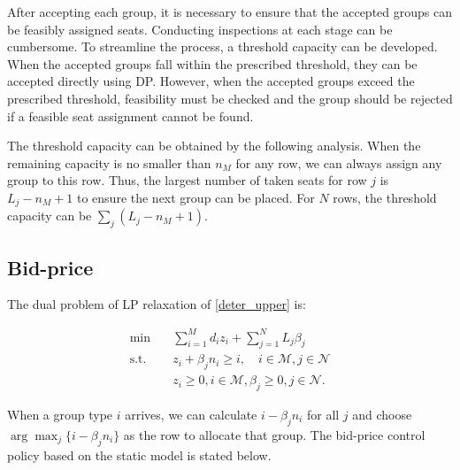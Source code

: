 



After accepting each group, it is necessary to ensure that the accepted groups can be feasibly assigned seats. Conducting inspections at each stage can be cumbersome. To streamline the process, a threshold capacity can be developed. When the accepted groups fall within the prescribed threshold, they can be accepted directly using DP. However, when the accepted groups exceed the prescribed threshold, feasibility must be checked and the group should be rejected if a feasible seat assignment cannot be found.


The threshold capacity can be obtained by the following analysis. When the remaining capacity is no smaller than $n_{M}$ for any row, we can always assign any group to this row. Thus, the largest number of taken seats for row $j$ is $L_j -n_{M} +1$ to ensure the next group can be placed. For $N$ rows, the threshold capacity can be $\sum_{j} (L_j -n_{M} +1)$.


\subsection{Bid-price}

The dual problem of LP relaxation of \eqref{deter_upper} is:

\begin{equation}\label{dual}
  \begin{aligned}
  \min \quad & \sum_{i=1}^{M} d_i z_i + \sum_{j= 1}^{N} L_j \beta_{j} \\
  \text {s.t.} \quad & z_{i} + \beta_j n_i \geq i, \quad i \in \mathcal{M}, j \in \mathcal{N} \\
  & z_{i} \geq 0, i \in \mathcal{M}, \beta_{j} \geq 0, j \in \mathcal{N}.
  \end{aligned}
\end{equation}

When a group type $i$ arrives, we can calculate $i -\beta_{j} n_i$ for all $j$ and choose $\arg \max_{j} \{i -\beta_{j} n_i\}$ as the row to allocate that group. The bid-price control policy based on the static model is stated below.

